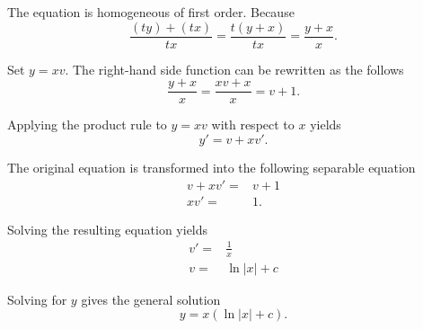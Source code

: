 \begin{exersol}
  \begin{steps}
    \item 
  The equation is homogeneous of first order. Because 
  \[\frac{(ty)+(tx)}{tx}=\frac{t(y+x)}{tx}=\frac{y+x}{x}.\]

  \item Set $y=xv$. The right-hand side function can be  rewritten as the follows
  \[\frac{y+x}{x}=\frac{xv+x}{x} =v+1.\]
  
  \item Applying the product rule to $y=xv$ with respect to $x$ yields
  \[y' = v+xv'.\]

  \item The original equation is transformed into
  the following separable equation
\[
  \begin{aligned}
    v+xv' =&v+1\\
    xv'=&1.
  \end{aligned}
  \]
  
  \item Solving the resulting equation yields
  \[
  \begin{aligned}
    v' =& \frac{1}{x}\\
    v  =& \ln |x| +c
  \end{aligned}
  \]
  
  \item Solving for $y$ gives the general solution
  \[y = x(\ln |x|+c).\]
\end{steps}
\end{exersol}

